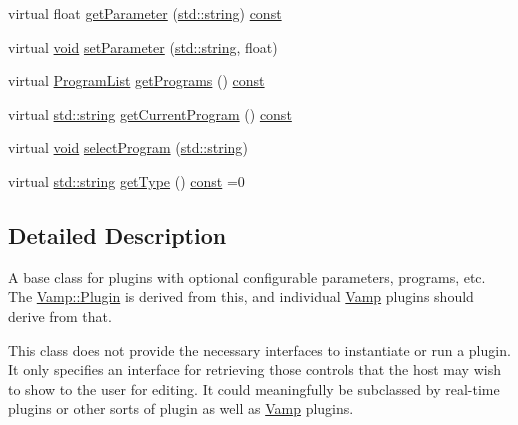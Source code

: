 \begin{DoxyCompactItemize}
\item 
virtual float \hyperlink{class_vamp_1_1_plugin_base_a97ababcd45348ceec998d0f8e0f38bf7}{get\+Parameter} (\hyperlink{test__lib_f_l_a_c_2format_8c_ab02026ad0de9fb6c1b4233deb0a00c75}{std\+::string}) \hyperlink{getopt1_8c_a2c212835823e3c54a8ab6d95c652660e}{const} 
\item 
virtual \hyperlink{sound_8c_ae35f5844602719cf66324f4de2a658b3}{void} \hyperlink{class_vamp_1_1_plugin_base_a6c718ce822f7b73b98940d59dcaa9366}{set\+Parameter} (\hyperlink{test__lib_f_l_a_c_2format_8c_ab02026ad0de9fb6c1b4233deb0a00c75}{std\+::string}, float)
\item 
virtual \hyperlink{class_vamp_1_1_plugin_base_a7f66f00437b21e5f694fe02356b12f20}{Program\+List} \hyperlink{class_vamp_1_1_plugin_base_abb307c60bdb981d5f5af50c3c4ae84af}{get\+Programs} () \hyperlink{getopt1_8c_a2c212835823e3c54a8ab6d95c652660e}{const} 
\item 
virtual \hyperlink{test__lib_f_l_a_c_2format_8c_ab02026ad0de9fb6c1b4233deb0a00c75}{std\+::string} \hyperlink{class_vamp_1_1_plugin_base_a24e77eccf1bdfbbca3c79bb25e8799b3}{get\+Current\+Program} () \hyperlink{getopt1_8c_a2c212835823e3c54a8ab6d95c652660e}{const} 
\item 
virtual \hyperlink{sound_8c_ae35f5844602719cf66324f4de2a658b3}{void} \hyperlink{class_vamp_1_1_plugin_base_aadd3a547ef140bae200473a9518e3353}{select\+Program} (\hyperlink{test__lib_f_l_a_c_2format_8c_ab02026ad0de9fb6c1b4233deb0a00c75}{std\+::string})
\item 
virtual \hyperlink{test__lib_f_l_a_c_2format_8c_ab02026ad0de9fb6c1b4233deb0a00c75}{std\+::string} \hyperlink{class_vamp_1_1_plugin_base_aec6beb4e410ee3a69d7f87c3715cd646}{get\+Type} () \hyperlink{getopt1_8c_a2c212835823e3c54a8ab6d95c652660e}{const}  =0
\end{DoxyCompactItemize}


\subsection{Detailed Description}
A base class for plugins with optional configurable parameters, programs, etc. The \hyperlink{class_vamp_1_1_plugin}{Vamp\+::\+Plugin} is derived from this, and individual \hyperlink{namespace_vamp}{Vamp} plugins should derive from that.

This class does not provide the necessary interfaces to instantiate or run a plugin. It only specifies an interface for retrieving those controls that the host may wish to show to the user for editing. It could meaningfully be subclassed by real-\/time plugins or other sorts of plugin as well as \hyperlink{namespace_vamp}{Vamp} plugins. 

